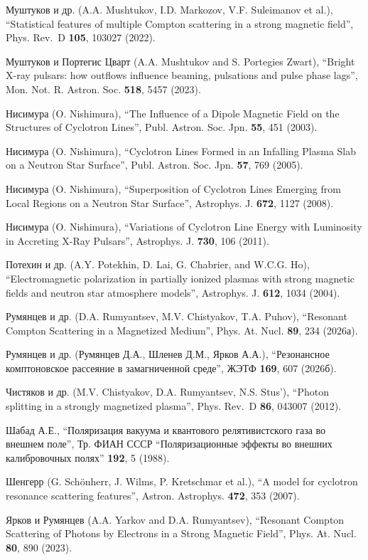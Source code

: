 \documentclass{pazh2col-win}
\begin{document}
\begin{references}
Муштуков и др. (A.A. Mushtukov, I.D. Markozov, V.F. Suleimanov et al.), ``Statistical features of multiple Compton scattering in a strong magnetic field'', Phys. Rev.~D {\bf 105}, 103027 (2022).

Муштуков и Портегис Цварт (A.A. Mushtukov and S. Portegies Zwart), ``Bright X-ray pulsars: how outflows influence beaming, pulsations and pulse phase lags'', Mon. Not. R. Astron. Soc. {\bf 518}, 5457 (2023).

Нисимура (O. Nishimura), ``The Influence of a Dipole Magnetic Field on the Structures of Cyclotron Lines'', Publ. Astron. Soc. Jpn. {\bf 55}, 451 (2003).

Нисимура (O. Nishimura), ``Cyclotron Lines Formed in an Infalling Plasma Slab on a Neutron Star Surface'', Publ. Astron. Soc. Jpn. {\bf 57}, 769 (2005).

Нисимура (O. Nishimura), ``Superposition of Cyclotron Lines Emerging from Local Regions on a Neutron Star Surface'', Astrophys. J. {\bf 672}, 1127 (2008).

Нисимура (O. Nishimura), ``Variations of Cyclotron Line Energy with Luminosity in Accreting X-Ray Pulsars'', Astrophys. J. {\bf 730}, 106 (2011).

Потехин и др. (A.Y. Potekhin, D. Lai, G. Chabrier, and W.C.G. Ho), ``Electromagnetic polarization in partially ionized plasmas with strong magnetic fields and neutron star atmosphere models'', Astrophys. J. {\bf 612}, 1034 (2004).

Румянцев и др. (D.A. Rumyantsev, M.V. Chistyakov, T.A. Puhov), ``Resonant Compton Scattering in a Magnetized Medium'', Phys. At. Nucl. {\bf 89}, 234 (2026а).

Румянцев и др. (Румянцев Д.А., Шленев Д.М., Ярков А.А.), ``Резонансное комптоновское рассеяние в замагниченной среде'',  ЖЭТФ {\bf 169}, 607 (2026б).

Чистяков и др. (M.V. Chistyakov, D.A. Rumyantsev, N.S. Stus'), ``Photon splitting in a strongly magnetized plasma'', Phys. Rev.~D {\bf 86}, 043007 (2012).

Шабад А.Е., ``Поляризация вакуума и квантового релятивистского газа во внешнем поле'', Тр. ФИАН СССР ``Поляризационные эффекты во внешних калибровочных полях'' {\bf 192}, 5 (1988).

Шенгерр (G. Sch\"onherr, J. Wilms, P. Kretschmar et al.), ``A model for cyclotron resonance scattering features'', Astron. Astrophys. {\bf 472}, 353 (2007).

Ярков и Румянцев (A.A. Yarkov and D.A. Rumyantsev), ``Resonant Compton Scattering of Photons by Electrons in a Strong Magnetic Field'', Phys. At. Nucl. {\bf 80}, 890 (2023).

\end{references}
\end{document}
